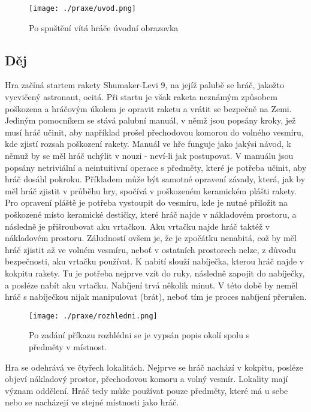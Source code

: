 \documentclass[main.tex]{subfiles}
\begin{document}
		\begin{figure}[h]
			\centering
			\texttt{[image: ./praxe/uvod.png]}
			\caption{Po spuštění vítá hráče úvodní obrazovka}
		\end{figure}
\subsection{Děj}
Hra začíná startem rakety Shumaker-Levi 9, na jejíž palubě se hráč, jakožto vycvičený astronaut, ocitá. Při startu je však raketa neznámým způsobem poškozena a hráčovým úkolem je opravit raketu a vrátit se bezpečně na Zemi. Jediným pomocníkem se stává palubní manuál, v němž jsou popsány kroky, jež musí hráč učinit, aby například prošel přechodovou komorou do volného vesmíru, kde zjistí rozsah poškození rakety. Manuál ve hře funguje jako jakýsi návod, k němuž by se měl hráč uchýlit v nouzi - neví-li jak postupovat. V manuálu jsou popsány netriviální a neintuitivní operace s předměty, které je potřeba učinit, aby hráč dosáhl pokroku. Příkladem může být samotné opravení závady, která, jak by měl hráč zjistit v průběhu hry, spočívá v poškozeném keramickém plášti rakety. Pro opravení pláště je potřeba vystoupit do vesmíru, kde je nutné přiložit na poškozené místo keramické destičky, které hráč najde v nákladovém prostoru, a následně je přišroubovat aku vrtačkou. Aku vrtačku najde hráč taktéž v nákladovém prostoru. Záludností ovšem je, že je zpočátku nenabitá, což by měl hráč zjistit až ve volném vesmíru, neboť v ostatních prostorech nelze, z důvodu bezpečnosti, aku vrtačku používat. K nabití slouží nabíječka, kterou hráč najde v kokpitu rakety. Tu je potřeba nejprve vzít do ruky, následně zapojit do nabíječky, a posléze nabít aku vrtačku. Nabíjení trvá několik minut. V této době by neměl hráč s nabíječkou nijak manipulovat (brát), neboť tím je proces nabíjení přerušen.  
		\begin{figure}[h]
			\centering
			\texttt{[image: ./praxe/rozhledni.png]}
			\caption{Po zadání příkazu rozhlédni se je vypsán popis okolí spolu s předměty v místnost.}
		\end{figure}


Hra se odehrává ve čtyřech lokalitách. Nejprve se hráč nachází v kokpitu, posléze objeví nákladový prostor, přechodovou komoru a volný vesmír. Lokality mají význam oddělení. Hráč tedy může používat pouze předměty, které má u sebe nebo se nacházejí ve stejné místnosti jako hráč. 
\end{document}
